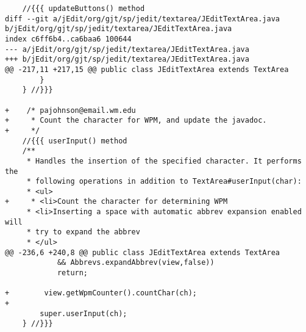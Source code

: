 \documentclass[12pt]{article}
\begin{document}
\begin{verbatim}
 	//{{{ updateButtons() method
diff --git a/jEdit/org/gjt/sp/jedit/textarea/JEditTextArea.java b/jEdit/org/gjt/sp/jedit/textarea/JEditTextArea.java
index c6ff6b4..ca6baa6 100644
--- a/jEdit/org/gjt/sp/jedit/textarea/JEditTextArea.java
+++ b/jEdit/org/gjt/sp/jedit/textarea/JEditTextArea.java
@@ -217,11 +217,15 @@ public class JEditTextArea extends TextArea
 		}
 	} //}}}
 
+    /* pajohnson@email.wm.edu
+     * Count the character for WPM, and update the javadoc.
+     */
 	//{{{ userInput() method
 	/**
 	 * Handles the insertion of the specified character. It performs the
 	 * following operations in addition to TextArea#userInput(char):
 	 * <ul>
+     * <li>Count the character for determining WPM
 	 * <li>Inserting a space with automatic abbrev expansion enabled will
 	 * try to expand the abbrev
 	 * </ul>
@@ -236,6 +240,8 @@ public class JEditTextArea extends TextArea
 			&& Abbrevs.expandAbbrev(view,false))
 			return;
 
+        view.getWpmCounter().countChar(ch);
+
 		super.userInput(ch);
 	} //}}}
 
\end{verbatim}
\end{document}
